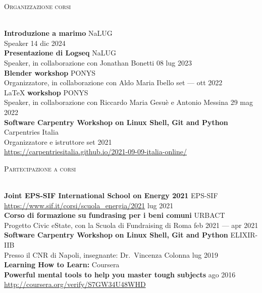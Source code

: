 \documentclass[a4paper]{article}
\newcommand{\lineunder} {
  \vspace*{-8pt} \\
  \hspace*{-18pt} \hrulefill \\
}
\newcommand{\header} [1] {
  {\hspace*{-18pt}\vspace*{6pt} \textsc{#1}}
  \vspace*{-6pt} \lineunder
}
\begin{document}
\header{Organizzazione corsi}
\vspace{1mm}

\textbf{Introduzione a marimo} \hfill NaLUG \\
Speaker \hfill 14 dic 2024 \\
\vspace*{2mm}
\textbf{Presentazione di Logseq} \hfill NaLUG \\
Speaker, in collaborazione con Jonathan Bonetti \hfill 08 lug 2023 \\
\vspace*{2mm}
\textbf{Blender workshop} \hfill PONYS \\
Organizzatore, in collaborazione con Aldo Maria Ibello \hfill set --- ott 2022 \\
\vspace*{2mm}
\LaTeX{} \textbf{workshop} \hfill PONYS \\
Speaker, in collaborazione con Riccardo Maria Gesuè e Antonio Messina \hfill 29 mag 2022 \\
\vspace*{2mm}
\textbf{Software Carpentry Workshop on Linux Shell, Git and Python} \hfill Carpentries Italia \\
Organizzatore e istruttore \hfill set 2021 \\
\url{https://carpentriesitalia.github.io/2021-09-09-italia-online/} \\
\vspace*{2mm}

\header{Partecipazione a corsi}
\vspace{1mm}

\textbf{Joint EPS-SIF International School on Energy 2021} \hfill EPS-SIF \\
\url{https://www.sif.it/corsi/scuola_energia/2021} \hfill lug 2021 \\
\vspace*{2mm}
\textbf{Corso di formazione su fundrasing per i beni comuni} \hfill URBACT \\
Progetto Civic eState, con la Scuola di Fundraising di Roma \hfill feb 2021 --- apr 2021\\
\vspace*{2mm}
\textbf{Software Carpentry Workshop on Linux Shell, Git and Python} \hfill ELIXIR-IIB\\
Presso il CNR di Napoli, insegnante: Dr.\ Vincenza Colonna \hfill lug 2019\\
\vspace*{2mm}
\textbf{Learning How to Learn:} \hfill Coursera\\
\textbf{Powerful mental tools to help you master tough subjects} \hfill ago 2016\\
\url{http://coursera.org/verify/S7GW34U48WHD}\\
\vspace*{2mm}
\end{document}
